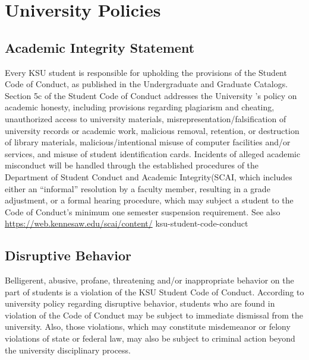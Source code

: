 \documentclass[11pt,]{article}
\begin{document}
\newpage

\hypertarget{university-policies}{%
\section{University Policies}\label{university-policies}}

\hypertarget{academic-integrity-statement}{%
\subsection{Academic Integrity Statement}\label{academic-integrity-statement}}

Every KSU student is responsible for upholding the provisions of the Student Code of Conduct, as published in
the Undergraduate and Graduate Catalogs. Section 5c of the Student Code of Conduct addresses the University
's policy on academic honesty, including provisions regarding plagiarism and cheating, unauthorized access
to university materials, misrepresentation/falsification of university records or academic work, malicious
removal, retention, or destruction of library materials, malicious/intentional misuse of computer facilities and/or
services, and misuse of student identification cards. Incidents of alleged academic misconduct will be
handled through the established procedures of the Department of Student Conduct and Academic
Integrity(SCAI, which includes either an ``informal'' resolution by a faculty member, resulting in a grade
adjustment, or a formal hearing procedure, which may subject a student to the Code of Conduct's
minimum one semester suspension requirement. See also \url{https://web.kennesaw.edu/scai/content/}
ksu-student-code-conduct

\hypertarget{disruptive-behavior}{%
\subsection{Disruptive Behavior}\label{disruptive-behavior}}

Belligerent, abusive, profane, threatening and/or inappropriate behavior on the part of students is a violation of
the KSU Student Code of Conduct. According to university policy regarding disruptive behavior, students who
are found in violation of the Code of Conduct may be subject to immediate dismissal from the university. Also,
those violations, which may constitute misdemeanor or felony violations of state or federal law, may also be
subject to criminal action beyond the university disciplinary process.
\end{document}
